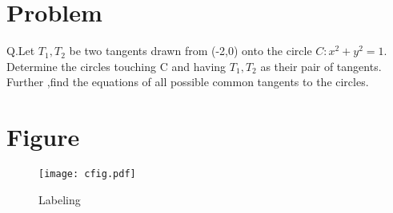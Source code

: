  \lstset{
frame=single, 
breaklines=true,
columns=fullflexible
}
\title{\mytitle}
\author{\myauthor\hspace{1em}\\\contact\\IITH\hspace{0.5em}-\hspace{0.5em}\mymodule}
\date{}
\hypersetup{pdfauthor=\myauthor,pdftitle=\mytitle,pdfkeywords=\mykeywords}
\sloppy

 \maketitle
 \tableofcontents
 
    
 

 
    
    
    
 
 \Large\section{Problem}
 Q.Let $T_1,T_2$ be two tangents drawn from  (-2,0) onto the circle $C:{x}^2+{y}^2=1$. Determine the circles touching C and having $T_1,T_2$ as their pair of tangents. Further ,find the equations of all possible common tangents to the circles.


\Large\section{Figure}

\begin{figure}[H]
\centering
\texttt{[image: cfig.pdf]}
\caption{Labeling}
\label{fig:triangle}
\end{figure}


